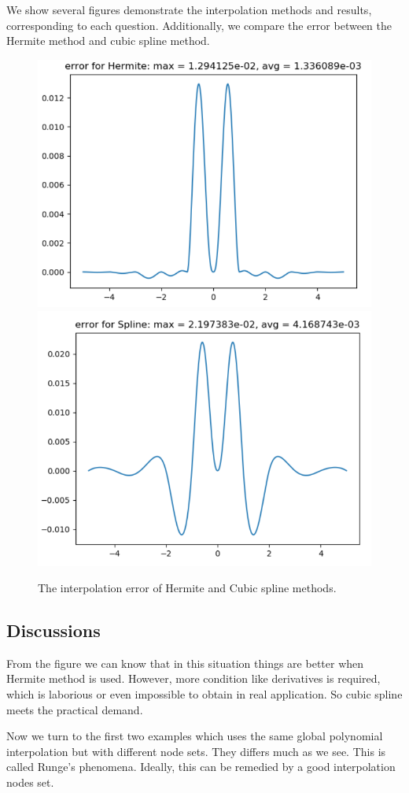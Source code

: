 We show several figures demonstrate the interpolation methods and results, corresponding to each question. Additionally, we compare the error between the Hermite method and cubic spline method. 
\begin{figure}[h]
	\centering
	\includegraphics[scale=.3]{../fig/err.png}
	\includegraphics[scale=.3]{../fig/err5.png}
	\caption{The interpolation error of Hermite and Cubic spline methods.}
\end{figure}

\subsection{Discussions}

From the figure we can know that in this situation things are better when Hermite method is used. However, more condition like derivatives is required, which is laborious or even impossible to obtain in real application. So cubic spline meets the practical demand. 

Now we turn to the first two examples which uses the same global polynomial interpolation but with different node sets. They differs much as we see.  This is called Runge's phenomena. Ideally, this can be remedied by a good interpolation nodes set.
